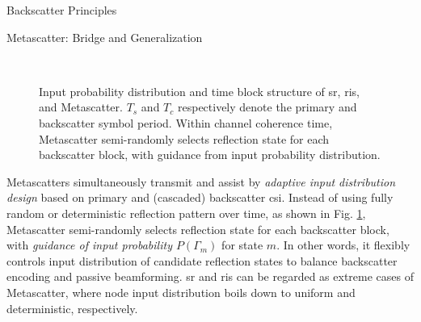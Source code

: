 \documentclass[journal]{IEEEtran}
\begin{document}
\begin{section}{Backscatter Principles}
	\begin{subsection}{Metascatter: Bridge and Generalization}
		\begin{figure}[!t]
			\centering
			\\
			\caption{
				Input probability distribution and time block structure of \gls{sr}, \gls{ris}, and Metascatter.
				$T_s$ and $T_c$ respectively denote the primary and backscatter symbol period.
				Within channel coherence time, Metascatter semi-randomly selects reflection state for each backscatter block, with guidance from input probability distribution.
			}
			\label{fi:metascatter}
		\end{figure}
		Metascatters simultaneously transmit and assist by \emph{adaptive input distribution design} based on primary and (cascaded) backscatter \gls{csi}.
		Instead of using fully random or deterministic reflection pattern over time, as shown in Fig. \ref{fi:metascatter}, Metascatter semi-randomly selects reflection state for each backscatter block, with \emph{guidance of input probability $P(\Gamma_m)$} for state $m$. In other words, it flexibly controls input distribution of candidate reflection states to balance backscatter encoding and passive beamforming. \gls{sr} and \gls{ris} can be regarded as extreme cases of Metascatter, where node input distribution boils down to uniform and deterministic, respectively.

\end{subsection}
\end{section}
\end{document}
